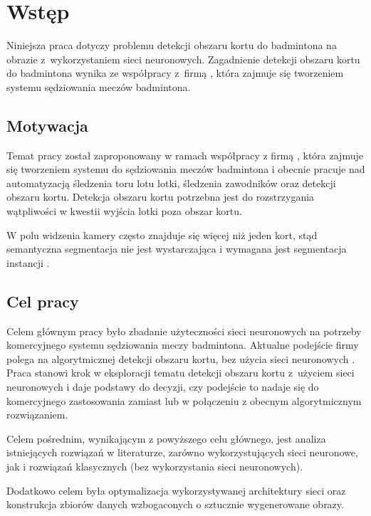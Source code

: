 \chapter{Wstęp}

Niniejsza praca dotyczy problemu detekcji obszaru kortu do badmintona na obrazie z~wykorzystaniem sieci neuronowych.
Zagadnienie detekcji obszaru kortu do badmintona wynika ze współpracy z~firmą \blue{}, która zajmuje się tworzeniem systemu sędziowania meczów badmintona.

\section{Motywacja}

Temat pracy został zaproponowany w ramach współpracy z firmą \blue{}, która zajmuje się tworzeniem systemu do sędziowania meczów badmintona i obecnie pracuje nad automatyzacją śledzenia toru lotu lotki, śledzenia zawodników oraz detekcji obszaru kortu.
Detekcja obszaru kortu potrzebna jest do rozstrzygania wątpliwości w kwestii wyjścia lotki poza obszar kortu.

W polu widzenia kamery często znajduje się więcej niż jeden kort, stąd semantyczna segmentacja nie jest wystarczająca i wymagana jest segmentacja instancji .

\section{Cel pracy}

Celem głównym pracy było zbadanie użyteczności sieci neuronowych na potrzeby komercyjnego systemu sędziowania meczy badmintona.
Aktualne podejście firmy \blue{} polega na algorytmicznej detekcji obszaru kortu, bez użycia sieci neuronowych .
Praca stanowi krok w eksploracji tematu detekcji obszaru kortu z~użyciem sieci neuronowych i daje podstawy do decyzji, czy podejście to nadaje się do komercyjnego zastosowania zamiast lub w połączeniu z obecnym algorytmicznym rozwiązaniem.

Celem pośrednim, wynikającym z powyższego celu głównego, jest analiza istniejących rozwiązań w literaturze, zarówno wykorzystujących sieci neuronowe, jak i rozwiązań klasycznych (bez wykorzystania sieci neuronowych).

Dodatkowo celem była optymalizacja wykorzystywanej architektury sieci oraz konstrukcja zbiorów danych wzbogaconych o sztucznie wygenerowane obrazy.
\\


